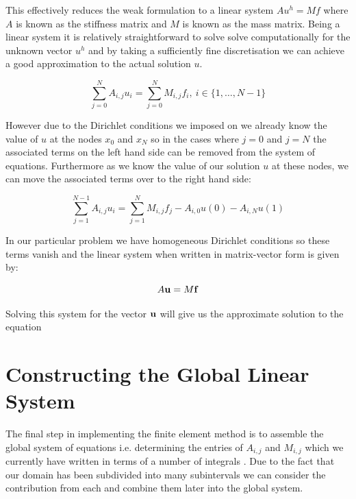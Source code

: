 This effectively reduces the weak formulation 
to a linear system $Au^h = Mf$ where $A$ is known as the stiffness matrix and
$M$ is known as the mass matrix. Being a linear system it is relatively
straightforward to solve solve computationally for the unknown vector $u^h$ and
by taking a sufficiently fine discretisation we can achieve a good
approximation to the actual solution $u$.

\begin{equation}
    \sum_{j=0}^NA_{i,j}u_i = \sum_{j=0}^NM_{i,j}f_i,\ i \in \{1,\ldots,N-1\}
\end{equation}

However due to the Dirichlet conditions we imposed on 
we already know the value of $u$ at the nodes $x_0$ and $x_N$ so in the cases
where $j = 0$ and $j = N$ the associated terms on the left hand side can be
removed from the system of equations. Furthermore as we know the value of our
solution $u$ at these nodes, we can move the associated terms over to the right
hand side:

\begin{equation}
    \sum_{j=1}^{N-1}A_{i,j}u_i =
        \sum_{j=1}^{N}M_{i,j}f_j - A_{i,0}u(0) - A_{i,N}u(1)
\end{equation}

In our particular problem we have homogeneous Dirichlet conditions so these
terms vanish and the linear system when written in matrix-vector form is given
by:

\begin{equation}\label{eq:oned-deterministic-fem}
    A\mathbf{u} = M\mathbf{f}
\end{equation}

Solving this system for the vector $\mathbf{u}$ will give us the approximate
solution to the equation 

\section{Constructing the Global Linear System}\label{sec:oned-deterministic-global-construct}

The final step in implementing the finite element method is to assemble the
global system of equations i.e.  determining the entries of $A_{i,j}$ and
$M_{i,j}$ which we currently have written in terms of a number of integrals
. Due to the fact that our domain has
been subdivided into many subintervals we can consider the contribution from
each and combine them later into the global system.

